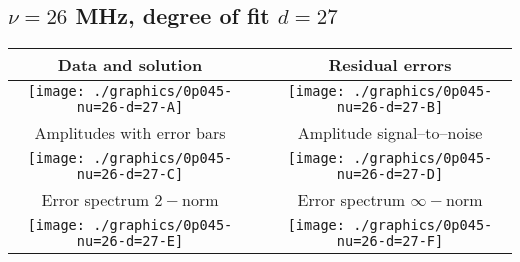 

% 

\clearpage{}
\break{}

\subsection{$\nu = 26$ MHz, degree of fit $d = 27$}

\begin{table}[h]
    \begin{center}
        \begin{tabular}{ccc}
            Data and solution & \quad & Residual errors \\\hline
            \texttt{[image: ./graphics/0p045-nu=26-d=27-A]} &&
            \texttt{[image: ./graphics/0p045-nu=26-d=27-B]} \\[15pt]
            Amplitudes with error bars && Amplitude signal--to--noise \\\hline
            \texttt{[image: ./graphics/0p045-nu=26-d=27-C]} &&
            \texttt{[image: ./graphics/0p045-nu=26-d=27-D]} \\[15pt]
            Error spectrum $2-$norm && Error spectrum $\infty-$norm \\\hline
            \texttt{[image: ./graphics/0p045-nu=26-d=27-E]} &&
            \texttt{[image: ./graphics/0p045-nu=26-d=27-F]} \\[15pt]
        \end{tabular}
    \end{center}
\label{fig:elev=45, nu=26}
\end{table}



\endinput
